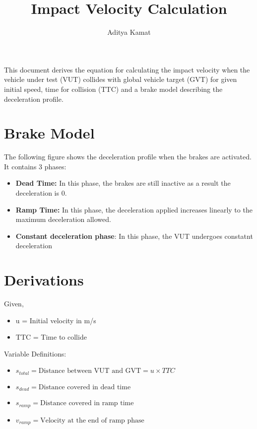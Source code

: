 \documentclass[12pt]{article}
\title{Impact Velocity Calculation}
\author{Aditya Kamat}
\begin{document}
\maketitle

This document derives the equation for calculating the impact velocity when the vehicle under test (VUT) collides with global vehicle target (GVT) for given initial speed, time for collision (TTC) and a brake model describing the deceleration profile.

\section{Brake Model}

The following figure shows the deceleration profile when the brakes are activated. It contains 3 phases: 

\begin{itemize}
  \item \textbf{Dead Time:} In this phase, the brakes are still inactive as a result the deceleration is 0.
  \item \textbf{Ramp Time:} In this phase, the deceleration applied increases linearly to the maximum deceleration allowed.
  \item \textbf{Constant deceleration phase}: In this phase, the VUT undergoes constatnt deceleration
  
\end{itemize}

\section{Derivations}
Given, 
\begin{itemize}
  \item u = Initial velocity in m/s
  \item TTC = Time to collide
\end{itemize}

\noindent Variable Definitions:
\begin{itemize}
  \item $s_{total} = \text{Distance between VUT and GVT} = {u \times TTC }$
  \item $s_{dead} = \text{Distance covered in dead time}$
  \item $s_{ramp} = \text{Distance covered in ramp time}$
  \item $v_{ramp} = \text{Velocity at the end of ramp phase}$
\end{itemize}
 
\end{document}
